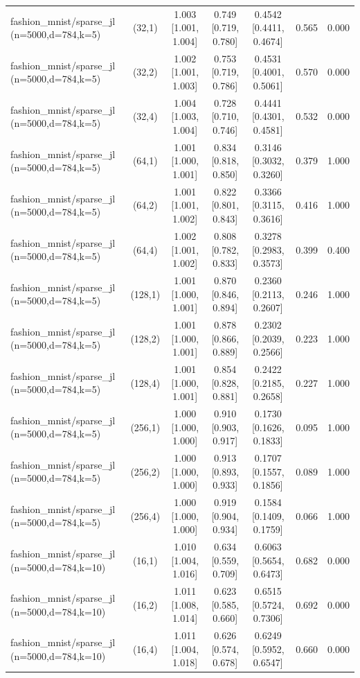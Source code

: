 \begin{tabular}{lcccccc}
fashion\_mnist/sparse\_jl (n=5000,d=784,k=5) & (32,1) & 1.003 [1.001, 1.004] & 0.749 [0.719, 0.780] & 0.4542 [0.4411, 0.4674] & 0.565 & 0.000 \\
fashion\_mnist/sparse\_jl (n=5000,d=784,k=5) & (32,2) & 1.002 [1.001, 1.003] & 0.753 [0.719, 0.786] & 0.4531 [0.4001, 0.5061] & 0.570 & 0.000 \\
fashion\_mnist/sparse\_jl (n=5000,d=784,k=5) & (32,4) & 1.004 [1.003, 1.004] & 0.728 [0.710, 0.746] & 0.4441 [0.4301, 0.4581] & 0.532 & 0.000 \\
fashion\_mnist/sparse\_jl (n=5000,d=784,k=5) & (64,1) & 1.001 [1.000, 1.001] & 0.834 [0.818, 0.850] & 0.3146 [0.3032, 0.3260] & 0.379 & 1.000 \\
fashion\_mnist/sparse\_jl (n=5000,d=784,k=5) & (64,2) & 1.001 [1.001, 1.002] & 0.822 [0.801, 0.843] & 0.3366 [0.3115, 0.3616] & 0.416 & 1.000 \\
fashion\_mnist/sparse\_jl (n=5000,d=784,k=5) & (64,4) & 1.002 [1.001, 1.002] & 0.808 [0.782, 0.833] & 0.3278 [0.2983, 0.3573] & 0.399 & 0.400 \\
fashion\_mnist/sparse\_jl (n=5000,d=784,k=5) & (128,1) & 1.001 [1.000, 1.001] & 0.870 [0.846, 0.894] & 0.2360 [0.2113, 0.2607] & 0.246 & 1.000 \\
fashion\_mnist/sparse\_jl (n=5000,d=784,k=5) & (128,2) & 1.001 [1.000, 1.001] & 0.878 [0.866, 0.889] & 0.2302 [0.2039, 0.2566] & 0.223 & 1.000 \\
fashion\_mnist/sparse\_jl (n=5000,d=784,k=5) & (128,4) & 1.001 [1.000, 1.001] & 0.854 [0.828, 0.881] & 0.2422 [0.2185, 0.2658] & 0.227 & 1.000 \\
fashion\_mnist/sparse\_jl (n=5000,d=784,k=5) & (256,1) & 1.000 [1.000, 1.000] & 0.910 [0.903, 0.917] & 0.1730 [0.1626, 0.1833] & 0.095 & 1.000 \\
fashion\_mnist/sparse\_jl (n=5000,d=784,k=5) & (256,2) & 1.000 [1.000, 1.000] & 0.913 [0.893, 0.933] & 0.1707 [0.1557, 0.1856] & 0.089 & 1.000 \\
fashion\_mnist/sparse\_jl (n=5000,d=784,k=5) & (256,4) & 1.000 [1.000, 1.000] & 0.919 [0.904, 0.934] & 0.1584 [0.1409, 0.1759] & 0.066 & 1.000 \\
fashion\_mnist/sparse\_jl (n=5000,d=784,k=10) & (16,1) & 1.010 [1.004, 1.016] & 0.634 [0.559, 0.709] & 0.6063 [0.5654, 0.6473] & 0.682 & 0.000 \\
fashion\_mnist/sparse\_jl (n=5000,d=784,k=10) & (16,2) & 1.011 [1.008, 1.014] & 0.623 [0.585, 0.660] & 0.6515 [0.5724, 0.7306] & 0.692 & 0.000 \\
fashion\_mnist/sparse\_jl (n=5000,d=784,k=10) & (16,4) & 1.011 [1.004, 1.018] & 0.626 [0.574, 0.678] & 0.6249 [0.5952, 0.6547] & 0.660 & 0.000 \\

\end{tabular}
